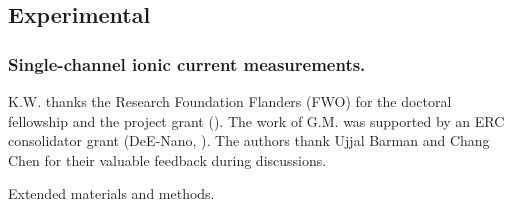 \documentclass[journal=ancac3,manuscript=article,etalmode=truncate,maxauthors=0,layout=twocolumn]{achemso}
\begin{document}
\subsection{Experimental}\label{sect:experiment}
\subsubsection{Single-channel ionic current measurements.}


\begin{acknowledgement}
K.W. thanks the Research Foundation Flanders (FWO) for the doctoral fellowship and the project grant 
(). The work of G.M. was supported by an ERC consolidator grant (DeE-Nano, ).
The authors thank Ujjal Barman and Chang Chen for their valuable feedback during discussions.
\end{acknowledgement}


\begin{suppinfo}
	Extended materials and methods.
\end{suppinfo}




%
\end{document}
